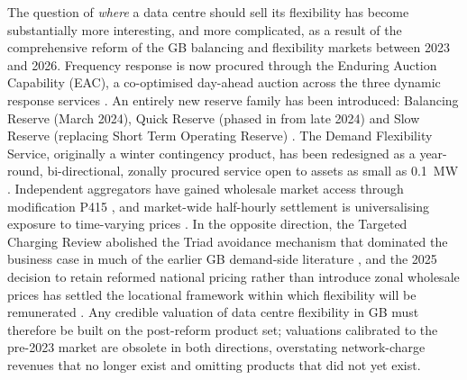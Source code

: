 \documentclass[lettersize,journal]{IEEEtran}
\begin{document}
The question of \emph{where} a data centre should sell its flexibility has become substantially more interesting, and more complicated, as a result of the comprehensive reform of the GB balancing and flexibility markets between 2023 and 2026. Frequency response is now procured through the Enduring Auction Capability (EAC), a co-optimised day-ahead auction across the three dynamic response services \cite{neso2026eac}. An entirely new reserve family has been introduced: Balancing Reserve (March 2024), Quick Reserve (phased in from late 2024) and Slow Reserve (replacing Short Term Operating Reserve) \cite{neso2026br,neso2026qr,neso2025srdesign}. The Demand Flexibility Service, originally a winter contingency product, has been redesigned as a year-round, bi-directional, zonally procured service open to assets as small as 0.1~MW \cite{neso2026dfsshakeup}. Independent aggregators have gained wholesale market access through modification P415 \cite{elexon2024p415}, and market-wide half-hourly settlement is universalising exposure to time-varying prices \cite{elexon2026mhhs}. In the opposite direction, the Targeted Charging Review abolished the Triad avoidance mechanism that dominated the business case in much of the earlier GB demand-side literature \cite{ofgem2019tcr}, and the 2025 decision to retain reformed national pricing rather than introduce zonal wholesale prices has settled the locational framework within which flexibility will be remunerated \cite{desnz2025rema}. Any credible valuation of data centre flexibility in GB must therefore be built on the post-reform product set; valuations calibrated to the pre-2023 market are obsolete in both directions, overstating network-charge revenues that no longer exist and omitting products that did not yet exist.
\end{document}
